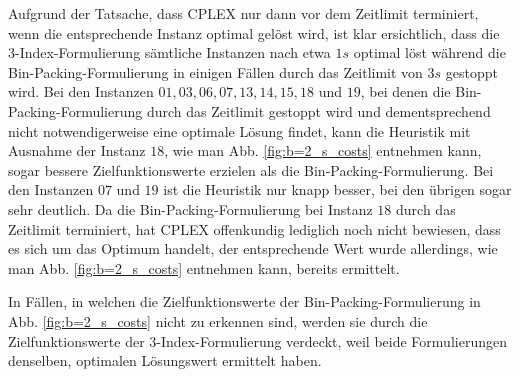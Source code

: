 Aufgrund der Tatsache, dass CPLEX nur dann vor dem Zeitlimit terminiert, wenn die entsprechende Instanz optimal gelöst wird, ist klar
ersichtlich, dass die 3-Index-Formulierung sämtliche Instanzen nach etwa $1s$ optimal löst während die Bin-Packing-Formulierung in einigen Fällen durch das Zeitlimit von $3s$ gestoppt wird.
Bei den Instanzen $01, 03, 06, 07, 13, 14, 15, 18$ und $19$, bei denen die Bin-Packing-Formulierung durch das Zeitlimit gestoppt wird und dementsprechend nicht notwendigerweise eine optimale Lösung findet, kann die Heuristik mit Ausnahme der Instanz
$18$, wie man Abb. \ref{fig:b=2_s_costs} entnehmen kann, sogar bessere Zielfunktionswerte erzielen als die Bin-Packing-Formulierung.
Bei den Instanzen $07$ und $19$ ist die Heuristik nur knapp besser, bei den übrigen sogar sehr deutlich.
Da die Bin-Packing-Formulierung bei Instanz $18$ durch das Zeitlimit terminiert, hat CPLEX offenkundig lediglich
noch nicht bewiesen, dass es sich um das Optimum handelt, der entsprechende Wert wurde allerdings, wie man Abb.
\ref{fig:b=2_s_costs} entnehmen kann, bereits ermittelt.

In Fällen, in welchen die Zielfunktionswerte der Bin-Packing-Formulierung in Abb. \ref{fig:b=2_s_costs} nicht zu erkennen sind,
werden sie durch die Zielfunktionswerte der 3-Index-Formulierung verdeckt, weil beide Formulierungen denselben, optimalen
Lösungswert ermittelt haben.

